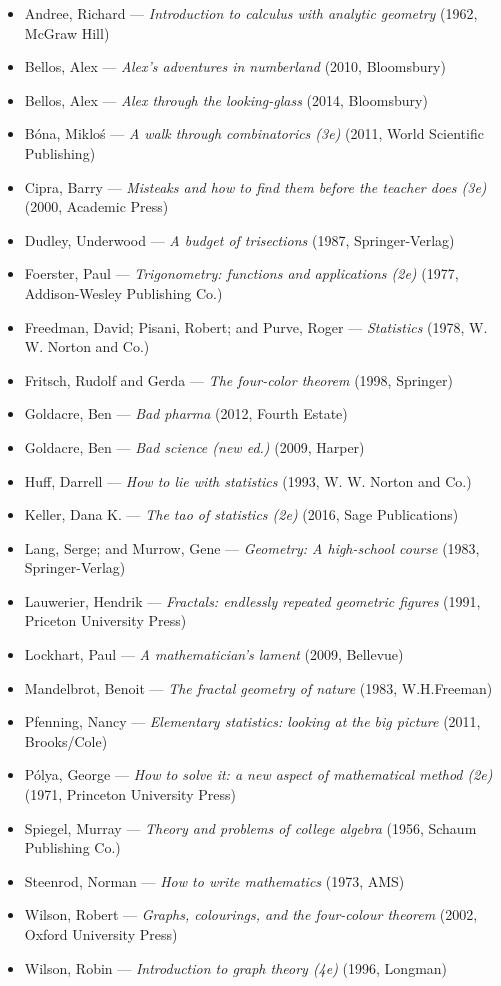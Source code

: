 \begin{itemize}[noitemsep]
  \item Andree, Richard --- \emph{Introduction to calculus with analytic geometry} (1962, McGraw Hill)
  \item Bellos, Alex --- \emph{Alex's adventures in numberland} (2010, Bloomsbury)
  \item Bellos, Alex --- \emph{Alex through the looking-glass} (2014, Bloomsbury)
  \item B\'ona, Miklo\'s --- \emph{A walk through combinatorics (3e)} (2011, World Scientific Publishing)
  \item Cipra, Barry --- \emph{Misteaks and how to find them before the teacher does (3e)} (2000, Academic Press)
  \item Dudley, Underwood --- \emph{A budget of trisections} (1987, Springer-Verlag)
  \item Foerster, Paul --- \emph{Trigonometry: functions and applications (2e)} (1977, Addison-Wesley Publishing Co.)
  \item Freedman, David; Pisani, Robert; and Purve, Roger --- \emph{Statistics} (1978, W. W. Norton and Co.)
  \item Fritsch, Rudolf and Gerda --- \emph{The four-color theorem} (1998, Springer)
  \item Goldacre, Ben --- \emph{Bad pharma} (2012, Fourth Estate)
  \item Goldacre, Ben --- \emph{Bad science (new ed.)} (2009, Harper)
  \item Huff, Darrell --- \emph{How to lie with statistics} (1993, W. W. Norton and Co.)
  \item Keller, Dana K. --- \emph{The tao of statistics (2e)} (2016, Sage Publications)
  \item Lang, Serge; and Murrow, Gene --- \emph{Geometry: A high-school course} (1983, Springer-Verlag)
  \item Lauwerier, Hendrik --- \emph{Fractals: endlessly repeated geometric figures} (1991, Priceton University Press)
  \item Lockhart, Paul --- \emph{A mathematician's lament} (2009, Bellevue)
  \item Mandelbrot, Benoit --- \emph{The fractal geometry of nature} (1983, W.H.Freeman)
  \item Pfenning, Nancy --- \emph{Elementary statistics: looking at the big picture} (2011, Brooks/Cole)
  \item P\'olya, George --- \emph{How to solve it: a new aspect of mathematical method (2e)} (1971, Princeton University Press)
  \item Spiegel, Murray --- \emph{Theory and problems of college algebra} (1956, Schaum Publishing Co.)
  \item Steenrod, Norman --- \emph{How to write mathematics} (1973, AMS)
  \item Wilson, Robert --- \emph{Graphs, colourings, and the four-colour theorem} (2002, Oxford University Press)
  \item Wilson, Robin --- \emph{Introduction to graph theory (4e)} (1996, Longman)
\end{itemize}


